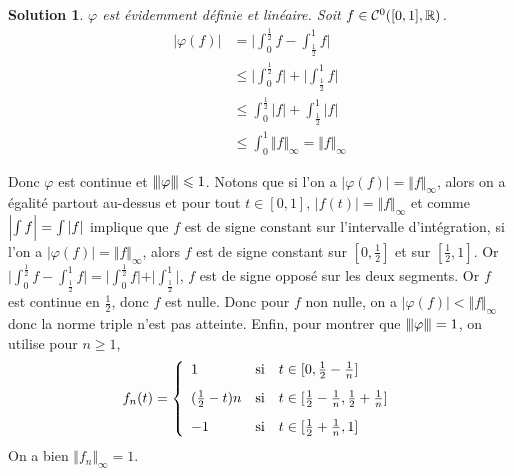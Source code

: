 \documentclass[12pt]{article}
\newtheorem{solution}{Solution}[section]
\theoremstyle{remark}
\newcommand{\vertiii}[1]{{\left\vert\kern-0.25ex\left\vert\kern-0.25ex\left\vert{}#1
\right\vert\kern-0.25ex\right\vert\kern-0.25ex\right\vert}}
\begin{document}
\begin{solution}
	$\varphi$ est évidemment définie et linéaire. Soit $f\in\mathcal{C}^{0}([0,1],\mathbb{R})$.
	\begin{align*}
		\vert\varphi(f)\vert
		&=\Biggl\vert\int_{0}^{\frac{1}{2}}f-\int_{\frac{1}{2}}^{1}f\Biggr\vert\\
		&\leqslant\Biggl\vert\int_{0}^{\frac{1}{2}}f\Biggr\vert+\Biggl\vert\int_{\frac{1}{2}}^{1}f\Biggr\vert\\
		&\leqslant\int_{0}^{\frac{1}{2}}\vert f\vert+\int_{\frac{1}{2}}^{1}\vert f\vert\\
		&\leqslant\int_{0}^{1}\Vert f\Vert_{\infty}=\Vert f\Vert_{\infty}
	\end{align*}
\end{solution}

Donc $\varphi$ est continue et $\vertiii{\varphi}\leqslant1$. Notons que si l'on a $\vert\varphi(f)\vert=\Vert f\Vert_{\infty}$, alors on a égalité partout au-dessus et pour tout $t\in[0,1]$, $\vert f(t)\vert=\Vert f\Vert_{\infty}$ et comme $\Bigl\vert\int f\Bigr\vert=\int\vert f\vert$ implique que $f$ est de signe constant sur l'intervalle d'intégration, si l'on a $\vert\varphi(f)\vert=\Vert f\Vert_{\infty}$, alors $f$ est de signe constant sur $[0,\frac{1}{2}]$ et sur $[\frac{1}{2},1]$.  Or $\vert\int_{0}^{\frac{1}{2}}f-\int_{\frac{1}{2}}^{1}f\vert=\vert\int_{0}^{\frac{1}{2}}f\vert+\vert\int_{\frac{1}{2}}^{1}\vert$, $f$ est de signe opposé sur les deux segments. Or $f$ est continue en $\frac{1}{2}$, donc $f$ est nulle. Donc pour $f$ non nulle, on a $\vert\varphi(f)\vert<\Vert f\Vert_{\infty}$ donc la norme triple n'est pas atteinte. Enfin, pour montrer que $\vertiii{\varphi}=1$, on utilise pour $n\geqslant1$,
$$
f_{n}(t)=
\left\{
	\begin{array}[]{lll}
		1 & \text{si} & t\in[0,\frac{1}{2}-\frac{1}{n}]\\[0.3cm]
		(\frac{1}{2}-t)n & \text{si} & t\in[\frac{1}{2}-\frac{1}{n},\frac{1}{2}+\frac{1}{n}]\\[0.3cm]
		-1 & \text{si} & t\in[\frac{1}{2}+\frac{1}{n},1]
	\end{array}
\right.
$$
On a bien $\Vert f_{n}\Vert_{\infty}=1$.
\end{document}
